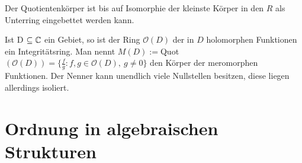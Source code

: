 %
%
% 
%
%
\begin{bem}
Der Quotientenkörper ist bis auf Isomorphie der kleinste Körper in den $R$ als Unterring eingebettet werden kann.
\end{bem}
%
%
%
%
%
%
%
\begin{bsp}
Ist D $\subseteq \mathbb{C}$ ein Gebiet, so ist der Ring $ \mathcal{O} (D) $ der in $D$ holomorphen Funktionen ein Integritätsring. Man nennt
$ M \left(D\right) := $Quot$\left( \mathcal{O} \left( D \right)\right) = \lbrace \frac{f}{g}: f,g \in \mathcal{O} (D), ~g \neq 0\rbrace$ den Körper der meromorphen Funktionen. Der Nenner kann unendlich viele Nullstellen besitzen, diese liegen allerdings isoliert. 
\end{bsp}
%

%
%
\section{Ordnung in algebraischen Strukturen}
